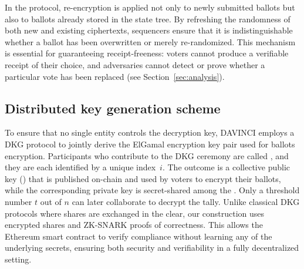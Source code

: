 In the protocol, re-encryption is applied not only to newly submitted ballots but also to ballots already stored in the state tree. By refreshing the randomness of both new and existing ciphertexts, sequencers ensure that it is indistinguishable whether a ballot has been overwritten or merely re-randomized. This mechanism is essential for guaranteeing receipt-freeness: voters cannot produce a verifiable receipt of their choice, and adversaries cannot detect or prove whether a particular vote has been replaced (see Section~\ref{sec:analysis}).

\subsection{Distributed key generation scheme}
\label{sec:cryptographic-primitives:dkg}

To ensure that no single entity controls the decryption key, DAVINCI employs a \ac{DKG} protocol to jointly derive the ElGamal encryption key pair used for ballots encryption. Participants who contribute to the \ac{DKG} ceremony are called \emph{\keywardens}, and they are each identified by a unique index~$i$. The outcome is a collective public key (\epk) that is published on-chain and used by voters to encrypt their ballots, while the corresponding private key is secret-shared among the \keywardens. Only a threshold number $t$ out of $n$ \keywardens can later collaborate to decrypt the tally. Unlike classical \ac{DKG} protocols where shares are exchanged in the clear, our construction uses encrypted shares and \ac{ZK-SNARK} proofs of correctness. This allows the Ethereum smart contract to verify compliance without learning any of the underlying secrets, ensuring both security and verifiability in a fully decentralized setting. 

